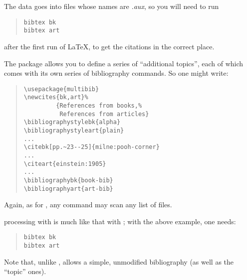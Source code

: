 The  data goes into files whose names are
\emph{.aux}, so you will need to run
\begin{quote}
\begin{verbatim}
bibtex bk
bibtex art
\end{verbatim}
\end{quote}
after the first run of \LaTeX{}, to get the citations in the correct
place.

The  package allows you to define a series of
``additional topics'', each of which comes with its own series of
bibliography commands.  So one might write:
\begin{quote}
\begin{verbatim}
\usepackage{multibib}
\newcites{bk,art}%
         {References from books,%
          References from articles}
\bibliographystylebk{alpha}
\bibliographystyleart{plain}
...
\citebk[pp.~23--25]{milne:pooh-corner}
...
\citeart{einstein:1905}
...
\bibliographybk{book-bib}
\bibliographyart{art-bib}
\end{verbatim}
\end{quote}
Again, as for , any  command may
scan any list of  files.

\BibTeX{} processing with  is much like that with
; with the above example, one needs:
\begin{quote}
\begin{verbatim}
bibtex bk
bibtex art
\end{verbatim}
\end{quote}
Note that, unlike ,  allows a
simple, unmodified bibliography (as well as the ``topic'' ones).  

